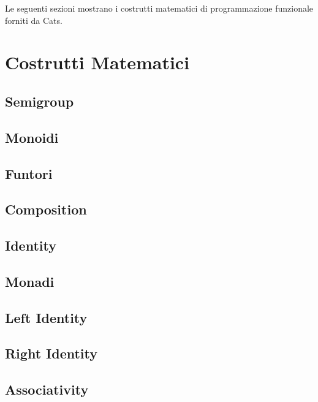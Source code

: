 \noindent Le seguenti sezioni mostrano i costrutti matematici di programmazione funzionale forniti da Cats.

\section{Costrutti Matematici}

\subsection{Semigroup}

\subsection{Monoidi}

\subsection{Funtori}

\subsection{Composition}

\subsection{Identity}

\subsection{Monadi}

\subsection{Left Identity}

\subsection{Right Identity}

\subsection{Associativity}
